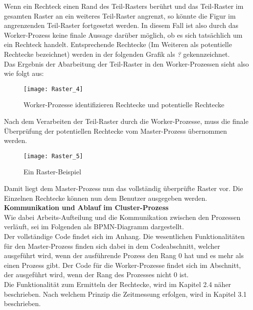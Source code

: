 \documentclass[
10pt, %
a4paper, %
oneside, %
headinclude,footinclude, %
BCOR5mm, %
]{scrartcl}
\begin{document}
Wenn ein Rechteck einen Rand des Teil-Rasters berührt und das Teil-Raster im gesamten Raster an ein weiteres Teil-Raster angrenzt, so könnte die Figur im angrenzenden Teil-Raster fortgesetzt werden. In diesem Fall ist also durch das Worker-Prozess keine finale Aussage darüber möglich, ob es sich tatsächlich um ein Rechteck handelt. Entsprechende Rechtecke (Im Weiteren als potentielle Rechtecke bezeichnet) werden in der folgenden Grafik als \textit{?} gekennzeichnet.\\
Das Ergebnis der Abarbeitung der Teil-Raster in den Worker-Prozessen sieht also wie folgt aus:

\begin{figure}[h]
	\centering 
	\texttt{[image: Raster\_4]} 
	\caption[Cluster-Prozess: Worker-Prozess: Rechtecke und potentielle Rechtecke]{Worker-Prozesse identifizieren Rechtecke und potentielle Rechtecke}
\end{figure}

Nach dem Verarbeiten der Teil-Raster durch die Worker-Prozesse, muss die finale Überprüfung der potentiellen Rechtecke vom Master-Prozess übernommen werden.

\begin{figure}[h]
	\centering 
	\texttt{[image: Raster\_5]} 
	\caption[Cluster-Prozess: Beispiel-Raster]{Ein Raster-Beispiel }
\end{figure}

Damit liegt dem Master-Prozess nun das vollständig überprüfte Raster vor. Die Einzelnen Rechtecke können nun dem Benutzer ausgegeben werden.\\

\textbf{Kommunikation und Ablauf im Cluster-Prozess }\\
Wie dabei Arbeits-Aufteilung und die Kommunikation zwischen den Prozessen verläuft, sei im Folgenden als BPMN-Diagramm dargestellt.\\

Der vollständige Code findet sich im Anhang. Die wesentlichen Funktionalitäten für den Master-Prozess finden sich dabei in dem Codeabschnitt, welcher ausgeführt wird, wenn der ausführende Prozess den Rang 0 hat und es mehr als einen Prozess gibt. Der Code für die Worker-Prozesse findet sich im Abschnitt, der ausgeführt wird, wenn der Rang des Prozesses nicht 0 ist.\\

Die Funktionalität zum Ermitteln der Rechtecke, wird im Kapitel 2.4 näher beschrieben. Nach welchem Prinzip die Zeitmessung erfolgen, wird in Kapitel 3.1 beschrieben.
\end{document}
